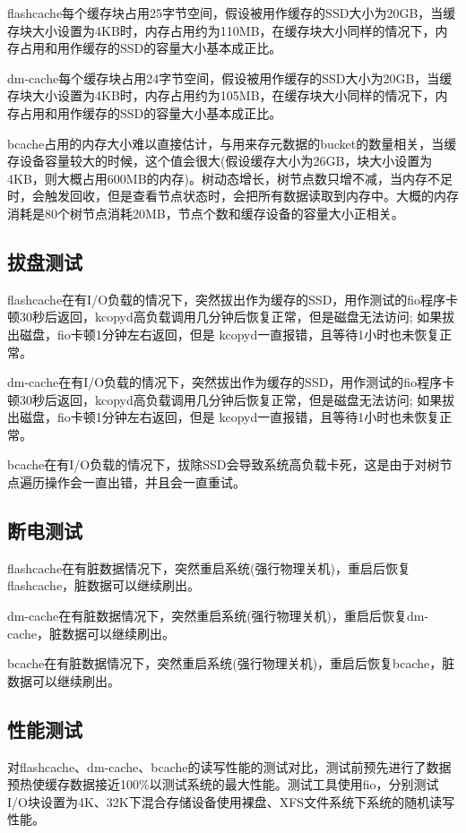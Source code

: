 flashcache每个缓存块占用25字节空间，假设被用作缓存的SSD大小为20GB，当缓存块大小设置为4KB时，内存占用约为110MB，在缓存块大小同样的情况下，内存占用和用作缓存的SSD的容量大小基本成正比。  

dm-cache每个缓存块占用24字节空间，假设被用作缓存的SSD大小为20GB，当缓存块大小设置为4KB时，内存占用约为105MB，在缓存块大小同样的情况下，内存占用和用作缓存的SSD的容量大小基本成正比。

bcache占用的内存大小难以直接估计，与用来存元数据的bucket的数量相关，当缓存设备容量较大的时候，这个值会很大(假设缓存大小为26GB，块大小设置为4KB，则大概占用600MB的内存)。树动态增长，树节点数只增不减，当内存不足时，会触发回收，但是查看节点状态时，会把所有数据读取到内存中。大概的内存消耗是80个树节点消耗20MB，节点个数和缓存设备的容量大小正相关。

\subsection{拔盘测试}

flashcache在有I/O负载的情况下，突然拔出作为缓存的SSD，用作测试的fio程序卡顿30秒后返回，kcopyd高负载调用几分钟后恢复正常，但是磁盘无法访问; 如果拔出磁盘，fio卡顿1分钟左右返回，但是 kcopyd一直报错，且等待1小时也未恢复正常。   

dm-cache在有I/O负载的情况下，突然拔出作为缓存的SSD，用作测试的fio程序卡顿30秒后返回，kcopyd高负载调用几分钟后恢复正常，但是磁盘无法访问; 如果拔出磁盘，fio卡顿1分钟左右返回，但是 kcopyd一直报错，且等待1小时也未恢复正常。 

bcache在有I/O负载的情况下，拔除SSD会导致系统高负载卡死，这是由于对树节点遍历操作会一直出错，并且会一直重试。 

\subsection{断电测试}

flashcache在有脏数据情况下，突然重启系统(强行物理关机)，重启后恢复flashcache，脏数据可以继续刷出。

dm-cache在有脏数据情况下，突然重启系统(强行物理关机)，重启后恢复dm-cache，脏数据可以继续刷出。 

bcache在有脏数据情况下，突然重启系统(强行物理关机)，重启后恢复bcache，脏数据可以继续刷出。

\subsection{性能测试}
      
对flashcache、dm-cache、bcache的读写性能的测试对比，测试前预先进行了数据预热使缓存数据接近100\%以测试系统的最大性能。测试工具使用fio，分别测试I/O块设置为4K、32K下混合存储设备使用裸盘、XFS文件系统下系统的随机读写性能。 

